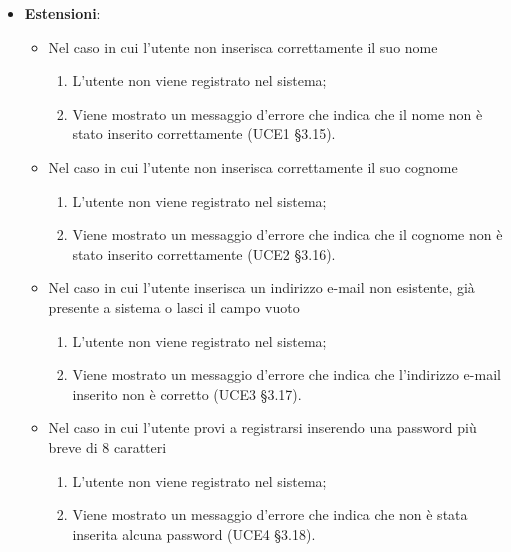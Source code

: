 \begin{itemize}
\item \textbf{Estensioni}:
\begin{itemize}
\item Nel caso in cui l'utente non inserisca correttamente il suo nome
\begin{enumerate}
	\item L'utente non viene registrato nel sistema;
	\item Viene mostrato un messaggio d'errore che indica che il nome non è stato inserito correttamente (UCE1 §3.15).
\end{enumerate}
\item Nel caso in cui l'utente non inserisca correttamente il suo cognome
\begin{enumerate}
	\item L'utente non viene registrato nel sistema;
	\item Viene mostrato un messaggio d'errore che indica che il cognome non è stato inserito correttamente (UCE2 §3.16).
\end{enumerate}
\item Nel caso in cui l’utente inserisca un indirizzo e-mail non esistente, già presente a sistema o lasci il campo vuoto
\begin{enumerate}
	\item L’utente non viene registrato nel sistema;
	\item Viene mostrato un messaggio d’errore che indica che l'indirizzo e-mail inserito non è corretto (UCE3 §3.17).
\end{enumerate}
\item Nel caso in cui l’utente provi a registrarsi inserendo una password più breve di 8 caratteri
\begin{enumerate}
	\item L’utente non viene registrato nel sistema;
	\item Viene mostrato un messaggio d’errore che indica che non è stata inserita alcuna password (UCE4 §3.18).
\end{enumerate}
\end{itemize}
\end{itemize}
